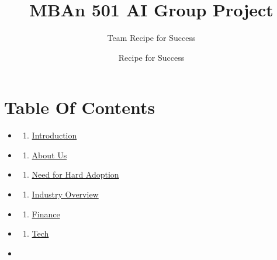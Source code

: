 \documentclass[
]{article}
\title{MBAn 501 AI Group Project}
\subtitle{Team Recipe for Success}
\author{Recipe for Success}
\date{}
\providecommand{\tightlist}{%
  \setlength{\itemsep}{0pt}\setlength{\parskip}{0pt}}
\begin{document}
\maketitle

{
\setcounter{tocdepth}{2}
\tableofcontents
}
\hypertarget{table-of-contents}{%
\section*{Table Of Contents}\label{table-of-contents}}

\begin{itemize}
\item
  \begin{enumerate}
  \def\labelenumi{\arabic{enumi}.}
  \tightlist
  \item
    \href{01-Intro.Rmd}{Introduction}
  \end{enumerate}
\item
  \begin{enumerate}
  \def\labelenumi{\arabic{enumi}.}
  \setcounter{enumi}{1}
  \tightlist
  \item
    \href{02-About-Us.Rmd}{About Us}
  \end{enumerate}
\item
  \begin{enumerate}
  \def\labelenumi{\arabic{enumi}.}
  \setcounter{enumi}{2}
  \tightlist
  \item
    \href{03-Need-for-Hard-Adoption.Rmd}{Need for Hard Adoption}
  \end{enumerate}
\item
  \begin{enumerate}
  \def\labelenumi{\arabic{enumi}.}
  \setcounter{enumi}{3}
  \tightlist
  \item
    \href{04-Industry-Overview.Rmd}{Industry Overview}
  \end{enumerate}
\item
  \begin{enumerate}
  \def\labelenumi{\arabic{enumi}.}
  \setcounter{enumi}{4}
  \tightlist
  \item
    \href{05-Finance.Rmd}{Finance}
  \end{enumerate}
\item
  \begin{enumerate}
  \def\labelenumi{\arabic{enumi}.}
  \setcounter{enumi}{5}
  \tightlist
  \item
    \href{06-Tech.Rmd}{Tech}
  \end{enumerate}
\item

\end{itemize}
\end{document}
